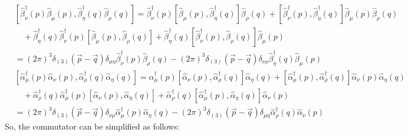 \[ 
\begin{split}
    &\left[ \hat{\beta}_\nu^\dagger (p) \hat{\beta}_\mu (p), \hat{\beta}_\eta^\dagger (q) \hat{\beta}_\rho (q) \right] = \hat{\beta}_\nu^\dagger (p) \left[ \hat{\beta}_\mu (p), \hat{\beta}_\eta^\dagger (q) \right] \hat{\beta}_\rho (q) + \left[ \hat{\beta}_\nu^\dagger (p), \hat{\beta}_\eta^\dagger (q) \right] \hat{\beta}_\mu (p) \hat{\beta}_\rho (q) \\
    &\quad + \hat{\beta}_\eta^\dagger (q)  \hat{\beta}_\nu^\dagger (p)\left[ \hat{\beta}_\mu (p),\hat{\beta}_\rho (q) \right]  +  \hat{\beta}_\eta^\dagger (q) \left[ \hat{\beta}_\nu^\dagger (p), \hat{\beta}_\rho (q) \right] \hat{\beta}_\mu (p) \\
    &= (2\pi)^3 \delta_{(3)}(\vec{p}-\vec{q}) \delta_{\mu\eta} \hat{\beta}_\nu^\dagger (p) \hat{\beta}_\rho (q) - (2\pi)^3 \delta_{(3)}(\vec{p}-\vec{q}) \delta_{\nu\rho}  \hat{\beta}_\eta^\dagger (q) \hat{\beta}_\mu (p) \\
    &\left[ \hat{\alpha}_\mu^\dagger (p) \hat{\alpha}_\nu (p), \hat{\alpha}_\rho^\dagger (q) \hat{\alpha}_\eta (q) \right] = \hat{\alpha}_\mu^\dagger (p) \left[ \hat{\alpha}_\nu (p), \hat{\alpha}_\rho^\dagger (q) \right] \hat{\alpha}_\eta (q) + \left[ \hat{\alpha}_\mu^\dagger (p), \hat{\alpha}_\rho^\dagger (q) \right] \hat{\alpha}_\nu (p) \hat{\alpha}_\eta (q) \\
    &\quad + \hat{\alpha}_\rho^\dagger (q)  \hat{\alpha}_\mu^\dagger (p)\left[\hat{\alpha}_\nu (p), \hat{\alpha}_\eta (q) \right]  +  \hat{\alpha}_\rho^\dagger (q) \left[ \hat{\alpha}_\mu^\dagger (p), \hat{\alpha}_\eta (q) \right] \hat{\alpha}_\nu (p) \\
    &= (2\pi)^3 \delta_{(3)}(\vec{p}-\vec{q}) \delta_{\nu\rho} \hat{\alpha}_\mu^\dagger (p) \hat{\alpha}_\eta (q) - (2\pi)^3 \delta_{(3)}(\vec{p}-\vec{q}) \delta_{\mu\eta}  \hat{\alpha}_\rho^\dagger (q)\hat{\alpha}_\nu (p) 
\end{split}
\]
So, the commutator can be simplified as follows:

